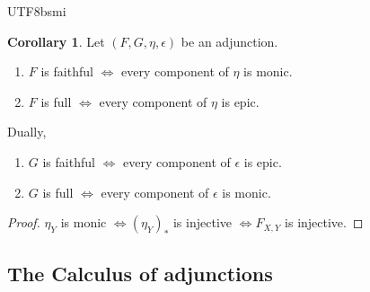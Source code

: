 \documentclass[12pt]{article}
\theoremstyle{definition}
\newtheorem{corollary}[definition]{Corollary}
\newcommand\<{\langle}
\renewcommand\>{\rangle}
\begin{document}
\begin{CJK}{UTF8}{bsmi}
\begin{corollary}
    Let $(F, G, \eta, \epsilon)$ be an adjunction.
    \begin{enumerate}
        \item $F$ is faithful $\iff$ every component of $\eta$ is monic.
        \item $F$ is full $\iff$ every component of $\eta$ is epic.
    \end{enumerate}
    Dually, 
    \begin{enumerate}
        \item $G$ is faithful $\iff$ every component of $\epsilon$ is epic.
        \item $G$ is full $\iff$ every component of $\epsilon$ is monic.
    \end{enumerate}
\end{corollary}
\begin{proof}
    $\eta_Y$ is monic $\iff(\eta_Y)_*$ is injective $\iff F_{X, Y}$ is injective.
\end{proof}

\subsection{The Calculus of adjunctions}


\end{CJK}
\end{document}
